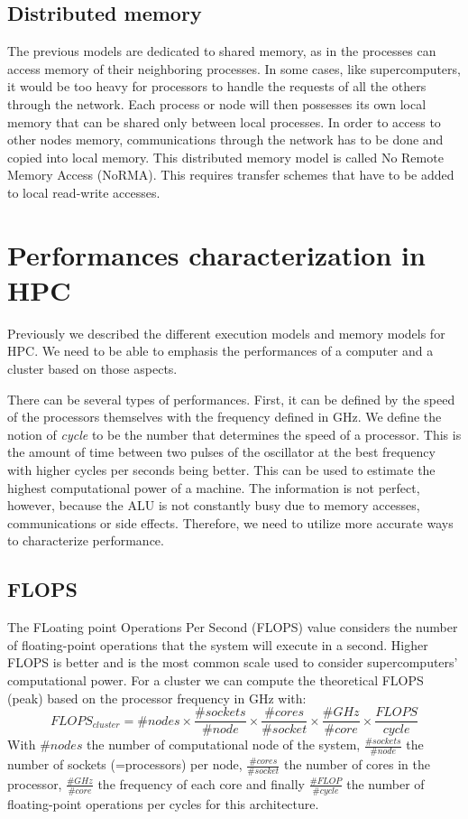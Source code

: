\subsection{Distributed memory}
The previous models are dedicated to shared memory, as in the processes can access memory of their neighboring processes. 
In some cases, like supercomputers, it would be too heavy for processors to handle the requests of all the others through the network. 
Each process or node will then possesses its own local memory that can be shared only between local processes. 
In order to access to other nodes memory, communications through the network has to be done and copied into local memory. 
This distributed memory model is called No Remote Memory Access (NoRMA).
This requires transfer schemes that have to be added to local read-write accesses.

\section{Performances characterization in HPC}
Previously we described the different execution models and memory models for HPC. 
We need to be able to emphasis the performances of a computer and a cluster based on those aspects.

There can be several types of performances.
First, it can be defined by the speed of the processors themselves with the frequency defined in GHz. 
We define the notion of \textit{cycle} to be the number that determines the speed of a processor. 
This is the amount of time between two pulses of the oscillator at the best frequency with higher cycles per seconds being better. 
This can be used to estimate the highest computational power of a machine. 
The information is not perfect, however, because the ALU is not constantly busy due to memory accesses, communications or side effects. 
Therefore, we need to utilize more accurate ways to characterize performance.

\subsection{FLOPS}


The FLoating point Operations Per Second (FLOPS) value considers the number of floating-point operations that the system will execute in a second. 
Higher FLOPS is better and is the most common scale used to consider supercomputers' computational power. 
For a cluster we can compute the theoretical FLOPS (peak) based on the processor frequency in GHz with:
\begin{equation}
FLOPS_{cluster} = \#nodes \times \frac{\#sockets}{\#node} \times \frac{\#cores}{\#socket} \times \frac{\#GHz}{\#core} \times \frac{FLOPS}{cycle}
\end{equation}
With $\#nodes$ the number of computational node of the system, $\frac{\#sockets}{\#node}$ the number of sockets (=processors) per node, $\frac{\#cores}{\#socket}$ the number of cores in the processor, $\frac{\#GHz}{\#core}$ the frequency of each core and finally $\frac{\#FLOP}{\#cycle}$ the number of floating-point operations per cycles for this architecture. 


